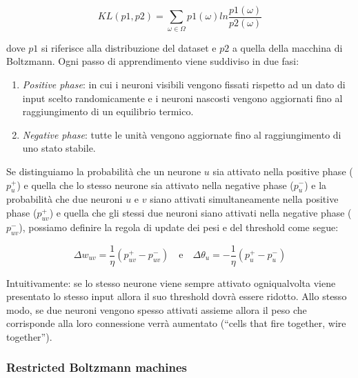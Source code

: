\documentclass[10pt,a4paper]{article}
\begin{document}
$$
KL(p1,p2) = \sum_{\omega \in \Omega} p1(\omega) ln\frac{p1(\omega)}{p2(\omega)}
$$ 

dove $p1$ si riferisce alla distribuzione del dataset e $p2$ a quella della macchina di Boltzmann. Ogni passo di apprendimento viene suddiviso in due fasi:

\begin{enumerate}
\item{\emph{Positive phase}: in cui i neuroni visibili vengono fissati rispetto ad un dato di input scelto randomicamente e i neuroni nascosti vengono aggiornati fino al raggiungimento di un equilibrio termico.}
\item{\emph{Negative phase}: tutte le unità vengono aggiornate fino al raggiungimento di uno stato stabile.}
\end{enumerate}

Se distinguiamo la probabilità che un neurone $u$ sia attivato nella positive phase ($p_u^{+}$) e quella che lo stesso neurone sia attivato nella negative phase ($p_u^{-}$) e la probabilità che due neuroni $u$ e $v$ siano attivati simultaneamente nella positive phase ($p_{uv}^{+}$) e quella che gli stessi due neuroni siano attivati nella negative phase ($p_{uv}^{-}$), possiamo definire la regola di update dei pesi e del threshold come segue:

$$
\Delta w_{uv} = \frac{1}{\eta} (p_{uv}^{+} - p_{uv}^{-}) 
\quad
\text{e}
\quad
\Delta \theta_u = -\frac{1}{\eta}(p_u^{+} - p_u^{-})
$$
 
Intuitivamente: se lo stesso neurone viene sempre attivato ogniqualvolta viene presentato lo stesso input allora il suo threshold dovrà essere ridotto. Allo stesso modo, se due neuroni vengono spesso attivati assieme allora il peso che corrisponde alla loro connessione verrà aumentato (“cells that fire together, wire together”).

\subsubsection{Restricted Boltzmann machines}
\end{document}
